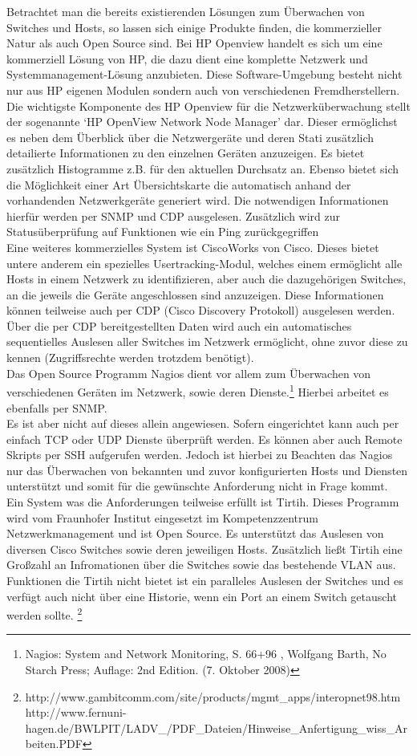 Betrachtet man die bereits existierenden Lösungen zum Überwachen von Switches und Hosts, so lassen sich einige Produkte finden, die kommerzieller Natur als auch Open Source sind.
Bei HP Openview handelt es sich um eine kommerziell Lösung von HP, die dazu dient eine komplette Netzwerk und Systemmanagement-Lösung anzubieten. Diese Software-Umgebung besteht nicht nur aus HP eigenen Modulen sondern auch von verschiedenen Fremdherstellern.
Die wichtigste Komponente des HP Openview für die Netzwerküberwachung stellt der sogenannte ‘HP OpenView Network Node Manager’ dar. Dieser ermöglichst es neben dem Überblick über die Netzwergeräte und deren Stati zusätzlich detailierte Informationen zu den einzelnen Geräten anzuzeigen. Es bietet zusätzlich Histogramme z.B. für den aktuellen Durchsatz an.
Ebenso bietet sich die Möglichkeit einer Art Übersichtskarte die automatisch anhand der vorhandenden Netzwerkgeräte generiert wird. Die notwendigen Informationen hierfür werden per SNMP und CDP ausgelesen. Zusätzlich wird zur Statusüberprüfung auf Funktionen wie ein Ping zurückgegriffen\\
Eine weiteres kommerzielles System ist CiscoWorks von Cisco. Dieses bietet untere anderem ein spezielles Usertracking-Modul, welches einem ermöglicht alle Hosts in einem Netzwerk zu identifizieren, aber auch die dazugehörigen Switches, an die jeweils die Geräte angeschlossen sind anzuzeigen. Diese Informationen können teilweise auch per CDP (Cisco Discovery Protokoll) ausgelesen werden. Über die per CDP bereitgestellten Daten wird auch ein automatisches sequentielles Auslesen aller Switches im Netzwerk ermöglicht, ohne zuvor diese zu kennen (Zugriffsrechte werden trotzdem benötigt).\\
Das Open Source Programm Nagios dient vor allem zum Überwachen von verschiedenen Geräten im Netzwerk, sowie deren Dienste.\footnote{Nagios: System and Network Monitoring, S. 66+96 , Wolfgang Barth, No Starch Press; Auflage: 2nd Edition. (7. Oktober 2008)}
Hierbei arbeitet es ebenfalls per SNMP.\\
Es ist aber nicht auf dieses allein angewiesen. Sofern eingerichtet kann auch per einfach TCP oder UDP Dienste überprüft werden. Es können aber auch Remote Skripts per SSH aufgerufen werden.
Jedoch ist hierbei zu Beachten das Nagios nur das Überwachen von bekannten und zuvor konfigurierten Hosts und Diensten unterstützt und somit für die gewünschte Anforderung nicht in Frage kommt.\\
Ein System  was die Anforderungen teilweise erfüllt ist Tirtih. Dieses Programm wird vom Fraunhofer Institut eingesetzt im Kompetenzzentrum Netzwerkmanagement und ist Open Source. Es unterstützt das Auslesen von diversen Cisco Switches sowie deren jeweiligen Hosts.
Zusätzlich ließt Tirtih eine Großzahl an Infromationen über die Switches sowie das bestehende VLAN aus. Funktionen die Tirtih nicht bietet ist ein paralleles Auslesen der Switches und es verfügt auch nicht über eine Historie, wenn ein Port an einem Switch getauscht werden sollte.
\footnote{http://www.gambitcomm.com/site/products/mgmt\_apps/interopnet98.htm
http://www.fernuni-hagen.de/BWLPIT/LADV\_/PDF\_Dateien/Hinweise\_Anfertigung\_wiss\_Arbeiten.PDF}

